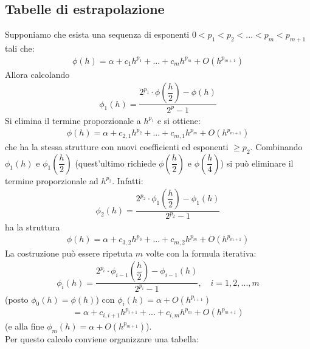 \documentclass[12pt,a4paper]{article}
\begin{document}
\subsection{Tabelle di estrapolazione}
Supponiamo che esista una sequenza di esponenti $ 0<p_1<p_2<...<p_m<p_{m+1}$ tali che:
\[ \begin{split}
	\phi(h)=\alpha+c_1h^{p_1}+...+c_mh^{p_m}+O(h^{p_{m+1}})
\end{split} \]
Allora calcolando
\[ \begin{split}
	\phi_1(h)=\dfrac{2^{p_1}\cdot \phi\left( \dfrac{h}{2} \right)-\phi (h) }{2^p-1}
\end{split} \]
Si elimina il termine proporzionale a $h^{p_1}$ e si ottiene:
\[ \begin{split}
	\phi(h)=\alpha+c_{2,1}h^{p_2}+...+c_{m,1}h^{p_m}+O(h^{p_{m+1}})
\end{split} \]
che ha la stessa strutture con
nuovi coefficienti ed esponenti $\geq p_2$. Combinando $\phi_1(h)$ e $\phi_1 \left( \dfrac{h}{2} \right)$ (quest'ultimo richiede $\phi \left( \dfrac{h}{2} \right)$ e $\phi \left( \dfrac{h}{4} \right)$) si può eliminare il termine proporzionale ad $h^{p_2}$. Infatti:
\[ \begin{split}
	\phi_2(h)=\dfrac{2^{p_2}\cdot \phi_1\left( \dfrac{h}{2} \right) -\phi_1 (h)}{2^{p_2}-1}
\end{split} \]
ha la struttura
\[ \begin{split}
	\phi(h)=\alpha+c_{3,2}h^{p_3}+...+c_{m,2}h^{p_m}+O(h^{p_{m+1}})
\end{split} \]
La costruzione può essere ripetuta $m$ volte con la formula iterativa:
\[ \begin{split}
	\phi_i(h)=\dfrac{2^{p_i}\cdot \phi_{i-1} \left( \dfrac{h}{2} \right) -\phi_{i-1} (h)}{2^{p_i}-1}, \quad i=1,2,...,m
\end{split} \]
(posto $\phi_0(h)=\phi(h)$) con  $\phi_i(h)=\alpha + O(h^{p_{i+1}})$
\[ \begin{split}
	=\alpha+c_{i,i+1}h^{p_{i+1}}+...+c_{i,m}h^{p_m}+O(h^{p_{m+1}})
\end{split} \]
(e alla fine $\phi_m(h)=\alpha + O(h^{p_{m+1}})$).\\
Per questo calcolo conviene organizzare una tabella:
\end{document}
